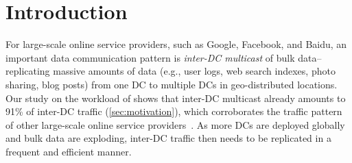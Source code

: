 \section{Introduction}

For large-scale online service providers, such as Google, Facebook, and
Baidu, an important data communication pattern is {\em inter-DC
multicast} of bulk data--replicating massive amounts of data (e.g.,
user logs, web search indexes, photo sharing, blog posts)
from one DC to multiple DCs in geo-distributed locations.
Our study on the workload of \company shows that inter-DC multicast
already amounts to 91\% of inter-DC traffic (\Section\ref{sec:motivation}),
which corroborates the traffic pattern of other large-scale online
service providers~\cite{kumar2015bwe,zhang2016piebridge}.
As more DCs are deployed globally and bulk data are exploding,
inter-DC traffic then needs to be replicated in a frequent and efficient manner.




